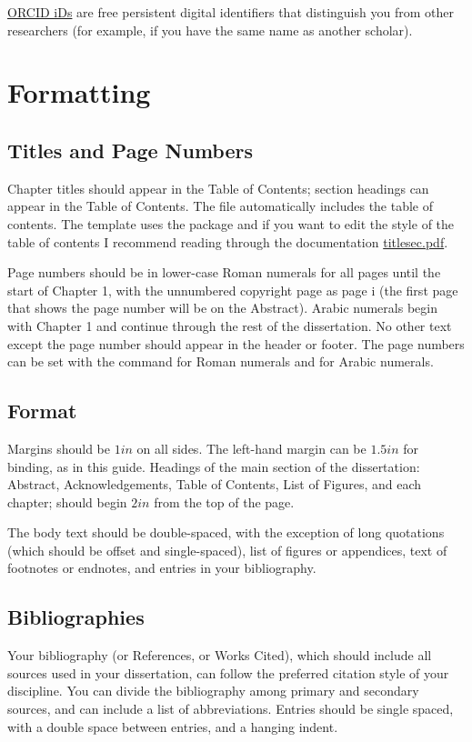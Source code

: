 \documentclass[12pt]{report}
\begin{document}
\href{https://orcid.org/}{ORCID iDs} are free persistent digital identifiers that distinguish you from other researchers (for example, if you have the same name as another scholar).
\newpage
\chapter{Formatting}
\section{Titles and Page Numbers}
Chapter titles should appear in the Table of Contents; section headings can appear in the Table of Contents. The  file automatically includes the table of contents. The template uses the  package and if you want to edit the style of the table of contents I recommend reading through the documentation \href{https://github.com/cacsphysics/BMC_Template_Info_Files/blob/main/titlesec.pdf}{titlesec.pdf}. 

Page numbers should be in lower-case Roman numerals for all pages until the start of Chapter 1, with the unnumbered copyright page as page i (the first page that shows the page number will be on the Abstract). Arabic numerals begin with Chapter 1 and continue through the rest of the dissertation. No other text except the page number should appear in the header or footer. The page numbers can be set with the command  for Roman numerals and  for Arabic numerals.
\section{Format}
Margins should be $1in$ on all sides. The left-hand margin can be $1.5in$ for binding, as in this guide. Headings of the main section of the dissertation: Abstract, Acknowledgements, Table of Contents, List of Figures, and each chapter; should begin $2in$ from the top of the page.

The body text should be double-spaced, with the exception of long quotations (which should be offset and single-spaced), list of figures or appendices, text of footnotes or endnotes, and entries in your bibliography.
\section{Bibliographies}
Your bibliography (or References, or Works Cited), which should include all sources used in your dissertation, can follow the preferred citation style of your discipline. You can divide the bibliography among primary and secondary sources, and can include a list of abbreviations. Entries should be single spaced, with a double space between entries, and a hanging indent.~\parencite{schaffner_temporal_2014, batchelor_1953}
\end{document}

